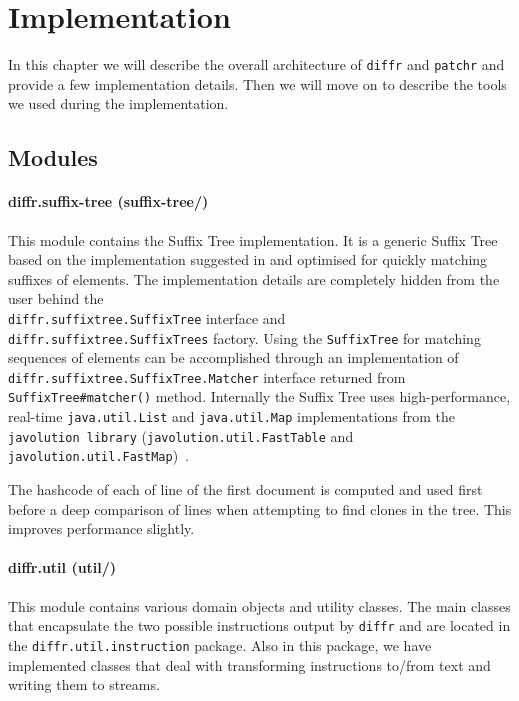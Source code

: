 \section{Implementation}

In this chapter we will describe the overall architecture of \texttt{diffr} and \texttt{patchr} and provide a few implementation details. Then we will move on to describe the tools we used during the implementation.

\subsection{Modules}

\paragraph{diffr.suffix-tree (suffix-tree/)}
This module contains the Suffix Tree implementation. It is a generic Suffix Tree based on the implementation suggested in \cite{Ukkonen95} and optimised for quickly matching suffixes of elements. The implementation details are completely hidden from the user behind the \\ \texttt{diffr.suffixtree.SuffixTree} interface and \\ \texttt{diffr.suffixtree.SuffixTrees} factory. Using the \texttt{SuffixTree} for matching sequences of elements can be accomplished through an implementation of \texttt{diffr.suffixtree.SuffixTree.Matcher} interface returned from \\ \texttt{SuffixTree\#matcher()} method. Internally the Suffix Tree uses high-performance, real-time \texttt{java.util.List} and \texttt{java.util.Map} implementations from the \texttt{javolution library} (\texttt{javolution.util.FastTable} and \texttt{javolution.util.FastMap})~\cite{javolution}. 

The hashcode of each of line of the first document is computed and used first before a deep comparison of lines when attempting to find clones in the tree.
This improves performance slightly.

\paragraph{diffr.util (util/)}
This module contains various domain objects and utility classes. The main classes that encapsulate the two possible instructions output by \texttt{diffr} and are located in the \texttt{diffr.util.instruction} package. Also in this package, we have implemented classes that deal with transforming instructions to/from text and writing them to streams.

